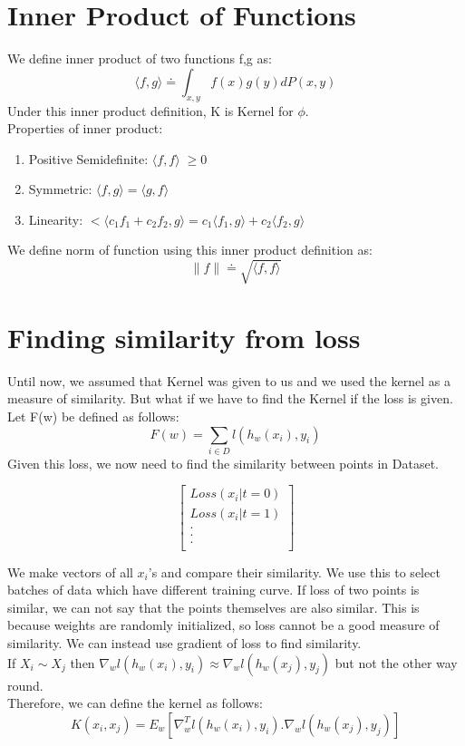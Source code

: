 \documentclass[12pt]{article}
\begin{document}
\section{Inner Product of Functions}
We define inner product of two functions f,g as: 
\[
    \langle f,g\rangle \doteq \int_{x,y}f(x)g(y)dP(x,y)
\]
Under this inner product definition, K is Kernel for $\phi$. \\
Properties of inner product: 
\begin{enumerate}
    \item Positive Semidefinite: $\langle f,f\rangle\;\geq 0$
    \item Symmetric: $\langle f,g\rangle = \langle g,f\rangle$
    \item Linearity: $<\langle c_{1}f_{1} + c_{2}f_{2},g\rangle = c_{1}\langle f_{1},g\rangle + c_{2}\langle f_{2},g\rangle$
\end{enumerate}
We define norm of function using this inner product definition as:
\[
    \lVert f\rVert \doteq \sqrt{\langle f,f\rangle}
\]

\section{Finding similarity from loss}
Until now, we assumed that Kernel was given to us and we used the kernel as a measure of similarity. But what if we have to find the Kernel if the loss is given.\\
Let F(w) be defined as follows:\\
\begin{equation*}
    F(w) = \sum_{i \in D} l( h_w(x_i), y_i)
\end{equation*}
Given this loss, we now need to find the similarity between points in Dataset.
\begin{center}
\[
\begin{bmatrix}
Loss(x_{i} | t=0)\\
Loss(x_{i} | t=1)\\
.\\
.\\
.\\
\end{bmatrix}
  \]  
\end{center}
We make vectors of all $x_{i}$'s and compare their similarity. 
We use this to select batches of data which have different training curve.
If loss of two points is similar, we can not say that the points themselves are also similar. This is because weights are randomly initialized, so loss cannot be a good measure of similarity. We can instead use gradient of loss to find similarity.
\\
If $X_i \sim X_j$ then $\nabla_w l(h_w(x_i),y_i) \approx \nabla_w l(h_w(x_j),y_j)$ but not the other way round.\\
Therefore, we can define the kernel as follows:
\begin{equation*}
    K(x_i,x_j) = E_w[\nabla_w^{T} l(h_w(x_i),y_i) . \nabla_w l(h_w(x_j),y_j)]
\end{equation*}
\end{document}

